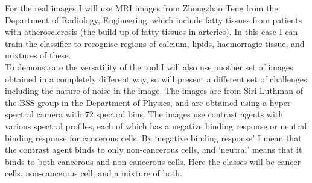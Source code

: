 \documentclass[12pt,a4paper,twoside]{article}
\begin{document}
For the real images I will use MRI images from Zhongzhao Teng from the Department 
of Radiology, Engineering, which include fatty tissues from patients with 
atherosclerosis (the build up of fatty tissues in arteries). In this case I can 
train the classifier to recognise regions of calcium, lipids, haemorragic tissue, 
and mixtures of these. \\

To demonstrate the versatility of the tool I will also use another set of images 
obtained in a completely different way, so will present a different set of 
challenges including the nature of noise in the image. The images are from Siri 
Luthman of the BSS group in the Department of Physics, and are obtained using a 
hyper-spectral camera with 72 spectral bins. The images use contrast agents with 
various spectral profiles, each of which has a negative binding response or 
neutral binding response for cancerous cells. By `negative binding response' I 
mean that the contrast agent binds to only non-cancerous cells, and `neutral' 
means that it binds to both cancerous and non-cancerous cells. Here the classes 
will be cancer cells, non-cancerous cell, and a mixture of both.












\end{document}
